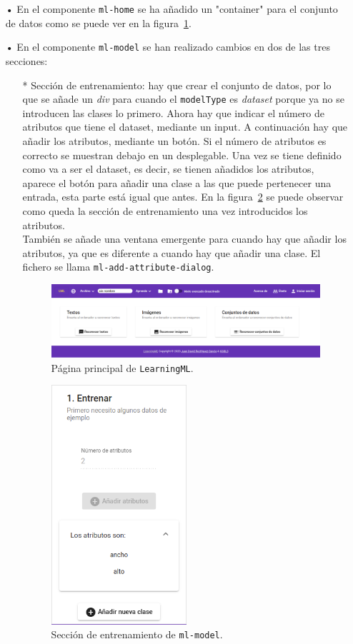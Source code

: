 \documentclass[a4paper, 12pt]{book}
\begin{document}
\begin{itemize}
	\item[•] En el componente \texttt{ml-home} se ha añadido un "container" para el conjunto de datos como se puede ver en la figura~\ref{fig:pagina_principal}.
	\item[•] En el componente \texttt{ml-model} se han realizado cambios en dos de las tres secciones:
	\begin{itemize}
		\item[*] Sección de entrenamiento: hay que crear el conjunto de datos, por lo que se añade un \emph{div} para cuando el \texttt{modelType} es \emph{dataset} porque ya no se introducen las clases lo primero. Ahora hay que indicar el número de atributos que tiene el dataset, mediante un input. A continuación hay que añadir los atributos, mediante un botón. Si el número de atributos es correcto se muestran debajo en un desplegable.
Una vez se tiene definido como va a ser el dataset, es decir, se tienen añadidos los atributos, aparece el botón para añadir una clase a las que puede pertenecer una entrada, esta parte está igual que antes. En la figura~\ref{fig:entrenar} se puede observar como queda la sección de entrenamiento una vez introducidos los atributos.\\
También se añade una ventana emergente para cuando hay que añadir los atributos, ya que es diferente a cuando hay que añadir una clase. El fichero se llama \texttt{ml-add-attribute-dialog}.

\begin{figure}
	\centering 
	\includegraphics[width=13cm, keepaspectratio]{img/pag_principal.png}
	\caption{Página principal de \texttt{LearningML}.} \label{fig:pagina_principal}
\end{figure}

\begin{figure}
	\centering 
	\includegraphics[width=5cm, keepaspectratio]{img/entrenar.png}
	\caption{Sección de entrenamiento de \texttt{ml-model}.} \label{fig:entrenar}
\end{figure}


\end{itemize}
\end{itemize}
\end{document}
